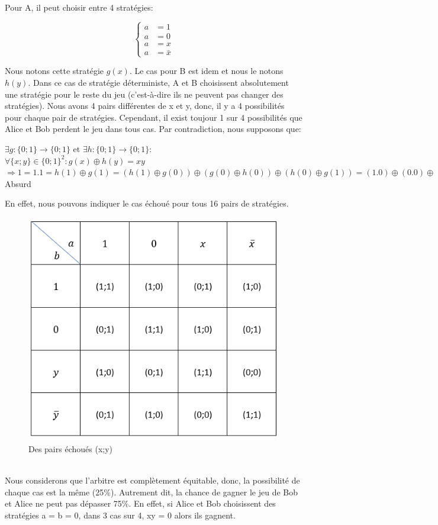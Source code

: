 \documentclass{article}
\begin{document}
Pour A, il peut choisir entre 4 stratégies: 

\[
\left\{
\begin{aligned}
a &= 1 \\
a &= 0 \\
a &= x \\
a &= \bar{x}
\end{aligned}
\right.
\]

Nous notons cette stratégie $g(x)$. Le cas pour B est idem et nous le notons $h(y)$. Dans ce cas de  stratégie déterministe, A et B choisissent absolutement une stratégie pour le reste du jeu (c'est-à-dire ils ne peuvent pas changer des stratégies). Nous avons 4 pairs différentes de x et y, donc, il y a 4 possibilités pour chaque pair de stratégies. Cependant, il exist toujour 1 sur 4 possibilités que Alice et Bob perdent le jeu dans tous cas. Par contradiction, nous supposons que:

\begin{center}
$\exists g: \{0;1\} \rightarrow \{0;1\}$ et $\exists h: \{0;1\} \rightarrow \{0;1\}$:
\\$\forall \{x;y\} \in \{0;1\}^2: g(x) \oplus h(y) = xy$ 
\\$\Rightarrow 1 = 1.1 = h(1) \oplus g(1) = (h(1) \oplus g(0)) \oplus (g(0) \oplus h(0)) \oplus (h(0) \oplus g(1)) = (1.0) \oplus (0.0) \oplus (0.1) = 0 \oplus 0 \oplus 0 = 0 \Rightarrow$ Absurd
\end{center}

En effet, nous pouvons indiquer le cas échoué pour tous 16 pairs de stratégies. 
\begin{figure}[h]
\centering
\includegraphics[scale = 0.5]{Table}
\centering
\caption{Des pairs échoués (x;y)}
\end{figure}
\\Nous considerons que l'arbitre est complètement équitable, donc, la possibilité de chaque cas est la même (25\%). Autrement dit, la chance de gagner le jeu de Bob et Alice ne peut pas dépasser 75\%. En effet, si Alice et Bob choisissent des stratégies a = b = 0, dans 3 cas sur 4, xy = 0 alors ils gagnent. 
\end{document}
